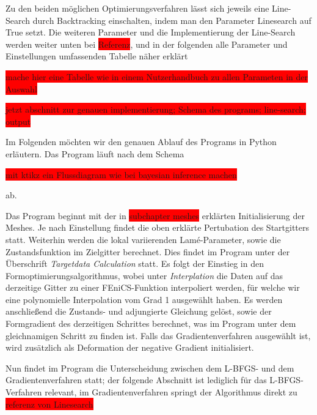 \documentclass[bibliography=totoc,12pt,a4paper]{scrartcl}
\theoremstyle{exampstyle}
\numberwithin{equation}{section}
\begin{document}
Zu den beiden möglichen Optimierungsverfahren lässt sich jeweils eine Line-Search durch Backtracking einschalten, indem man den Parameter \textsf{Linesearch} auf \textsf{True} setzt. Die weiteren Parameter und die Implementierung der Line-Search werden weiter unten bei \colorbox{red}{Referenz}, und in der folgenden alle Parameter und Einstellungen umfassenden Tabelle näher erklärt

\colorbox{red}{mache hier eine Tabelle wie in einem Nutzerhandbuch zu allen Parameten in der Auswahl}


\colorbox{red}{jetzt abschnitt zur genauen implementierung; Schema des programs; line-search; output}

Im Folgenden möchten wir den genauen Ablauf des Programs in Python erläutern. 
Das Program läuft nach dem Schema

\colorbox{red}{mit ktikz ein Flussdiagram wie bei bayesian inference machen}


ab. 

Das Program beginnt mit der in \colorbox{red}{subchapter meshes} erklärten Initialisierung der Meshes. Je nach Einstellung findet die oben erklärte Pertubation des Startgitters statt. Weiterhin werden die lokal variierenden Lamé-Parameter, sowie die Zustandsfunktion im Zielgitter berechnet. Dies findet im Program unter der Überschrift \textit{Targetdata Calculation} statt. Es folgt der Einstieg in den Formoptimierungsalgorithmus, wobei unter \textit{Interplation} die Daten auf das derzeitige Gitter zu einer FEniCS-Funktion interpoliert werden, für welche wir eine polynomielle Interpolation vom Grad 1 ausgewählt haben. Es werden anschließend die Zustands- und adjungierte Gleichung gelöst, sowie der Formgradient des derzeitigen Schrittes berechnet, was im Program unter dem gleichnamigen Schritt zu finden ist. Falls das Gradientenverfahren ausgewählt ist, wird zusätzlich als Deformation der negative Gradient initialisiert. 

Nun findet im Program die Unterscheidung zwischen dem L-BFGS- und dem Gradientenverfahren statt; der folgende Abschnitt ist lediglich für das L-BFGS-Verfahren relevant, im Gradientenverfahren springt der Algorithmus direkt zu \colorbox{red}{referenz von Linesearch}
\end{document}
